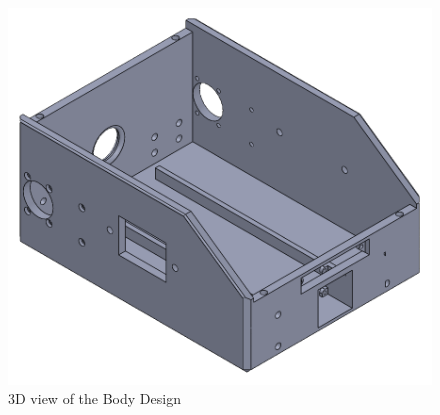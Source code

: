 \begin{figure}[h]
	\centering
	\includegraphics[width=0.8\linewidth]{Body_Design_3}
	\caption[3D view of the Body Design]{3D view of the Body Design}
	\label{fig:bodydesign3}
\end{figure}

\newpage
